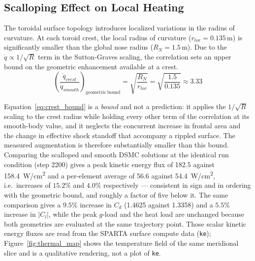 \subsection{Scalloping Effect on Local Heating}
The toroidal surface topology introduces localized variations in the radius of curvature. At each toroid crest, the local radius of curvature ($r_{tor} = 0.135$\,m) is significantly smaller than the global nose radius ($R_N = 1.5$\,m). Due to the $\dot{q} \propto 1/\sqrt{R}$ term in the Sutton-Graves scaling, the correlation sets an upper bound on the geometric enhancement available at a crest.
\begin{equation}
    \left(\frac{\dot{q}_{crest}}{\dot{q}_{smooth}}\right)_{\mathrm{geometric\ bound}} = \sqrt{\frac{R_N}{r_{tor}}} = \sqrt{\frac{1.5}{0.135}} \approx 3.33
    \label{eq:crest_bound}
\end{equation}

Equation~\eqref{eq:crest_bound} is a \emph{bound} and not a prediction: it applies the $1/\sqrt{R}$ scaling to the crest radius while holding every other term of the correlation at its smooth-body value, and it neglects the concurrent increase in frontal area and the change in effective shock standoff that accompany a rippled surface. The measured augmentation is therefore substantially smaller than this bound. Comparing the scalloped and smooth DSMC solutions at the identical run condition (step 2200) gives a peak kinetic energy flux of 182.5 against 158.4~W/cm\textsuperscript{2} and a per-element average of 56.6 against 54.4~W/cm\textsuperscript{2}, i.e.\ increases of $15.2\%$ and $4.0\%$ respectively --- consistent in sign and in ordering with the geometric bound, and roughly a factor of five below it. The same comparison gives a $9.5\%$ increase in $C_d$ (1.4625 against 1.3358) and a $5.5\%$ increase in $|C_l|$, while the peak $g$-load and the heat load are unchanged because both geometries are evaluated at the same trajectory point. Those scalar kinetic energy fluxes are read from the SPARTA surface compute data (\texttt{ke}); Figure~\ref{fig:thermal_map} shows the temperature field of the same meridional slice and is a qualitative rendering, not a plot of \texttt{ke}.

